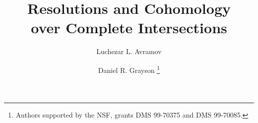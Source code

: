 
\CompileMatrices

\newtheorem{sRemark}{Remark}{\bfseries}{\rm}
\newtheorem{notation}[theorem]{Notation}{\bfseries}{\rm}
\newtheorem{construction}[theorem]{Construction}{\bfseries}{\rm}
\newtheorem{sExample}[sRemark]{Example}{\bfseries}{\rm}
\newtheorem{sCode}[sRemark]{Code}{\bfseries}{\rm}

\title{Resolutions and Cohomology \\ over Complete Intersections}

\author{Luchezar L. Avramov
   \and Daniel R. Grayson%
        \thanks{Authors supported by the NSF, grants DMS 99-70375 and
        DMS 99-70085.}}


\newcommand\ssum[1]{{\underset{#1}{\sum{\vphantom\sum}^{\scriptscriptstyle+}}}}

\def\ann{{\operatorname{ann}}}
\def\inv{{\operatorname{inv}}}
\def\reg{{\operatorname{reg}}}
\def\gr{{\operatorname{gr}}}
\def\bu{{\scriptscriptstyle\bullet}}
\def\HH{{\operatorname{H}}}
\def\Tor{\operatorname{Tor}}
\def\Ext{\operatorname{Ext}}
\def\rExt{\operatorname{ext}}
\def\Deg{\operatorname{Deg}}
\def\Poi{{P}}
\def\Ba{{I}}
\def\gen{{G}}
\def\depth{\operatorname{depth}}
\def\pd{\operatorname{pd}}
\def\cx{\operatorname{cx}}
\def\crdeg{\operatorname{crdeg}}
\def\rank{\operatorname{rank}}
\def\var{\operatorname{V}}
\def\lcontract{\operatorname{\lrcorner}}
\def\Hom{\operatorname{Hom}}
\def\Coker{\operatorname{Coker}}
\def\Ker{\operatorname{Ker}}
\def\Ima{\operatorname{Im}}
\def\C{{\mathbb C}}
\def\F{{\mathbb F}}
\def\N{{\mathbb N}}
\def\Z{{\mathbb Z}}
\def\DD{{\mathsf D}}
\def\SS{{\mathsf S}}
\def\Wedge{{\textstyle\bigwedge\limits}}
\def\a{\alpha}
\def\b{\beta}
\def\g{\gamma}
\def\d{\delta}
\def\e{\epsilon}
\def\o{\otimes}

